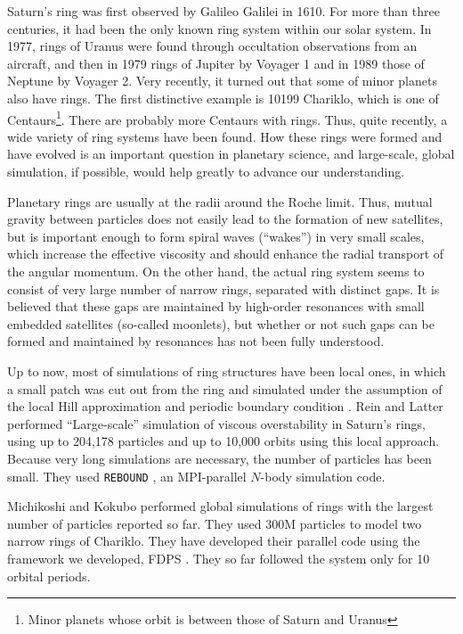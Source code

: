\documentclass[Afour,sageh,times]{sagej}
\newcommand{\rev}[1]{{#1}}
\begin{document}
Saturn's ring was first observed by Galileo Galilei in 1610. For more
than three centuries, it had been the only known ring system within
our solar system. In 1977, rings of Uranus were found through
occultation observations from an aircraft, and then in 1979 rings of
Jupiter by Voyager 1 and in 1989 those of Neptune by Voyager 2.  Very
recently, it turned out that some of minor planets also have
rings. \rev{The first distinctive example is 10199 Chariklo, which is
  one of Centaurs\footnote{Minor planets whose orbit is between those
    of Saturn and Uranus}.} There are probably more Centaurs with
rings. Thus, quite recently, a wide variety of ring systems have been
found.  How these rings were formed and have evolved is an important
question in planetary science, and large-scale, global simulation, if
possible, would help greatly to advance our understanding.

Planetary rings are usually at the radii around the Roche limit. Thus,
mutual gravity between particles does not easily lead to the formation
of new satellites, but is important enough to form spiral waves
(``wakes'') in very small scales, which increase the effective
viscosity and should enhance the radial transport of the angular
momentum. On the other hand, the actual ring system seems to consist
of very large number of narrow rings, separated with distinct gaps. It
is believed that these gaps are maintained by high-order resonances
with small embedded satellites (so-called moonlets), but whether or
not such gaps can be formed and maintained by resonances has not been
fully understood.

Up to now, most of simulations of ring structures have been local
ones, in which a small patch was cut out from the ring and simulated
under the assumption of the local Hill approximation and periodic
boundary condition \citep{WisdomTremaine1988}. Rein and Latter
\citep{ReinLatter2013} performed ``Large-scale'' simulation of viscous
overstability in Saturn's rings, using up to 204,178 particles and up
to 10,000 orbits using this local approach.  Because very long
simulations are necessary, the number of particles has been
small. They used {\tt REBOUND} \citep{ReinLiu2012}, an MPI-parallel
$N$-body simulation code.

Michikoshi and Kokubo \citep{MichikoshiKokubo2017} performed global
simulations of rings with the largest number of particles reported so
far. They used 300M particles to model two narrow rings of
Chariklo. They have developed their parallel code using the framework
we developed, FDPS \citep{Iwasawaetal2016, 2018PASJ...70...70N}. They
so far followed the system only for 10 orbital periods.
\end{document}
